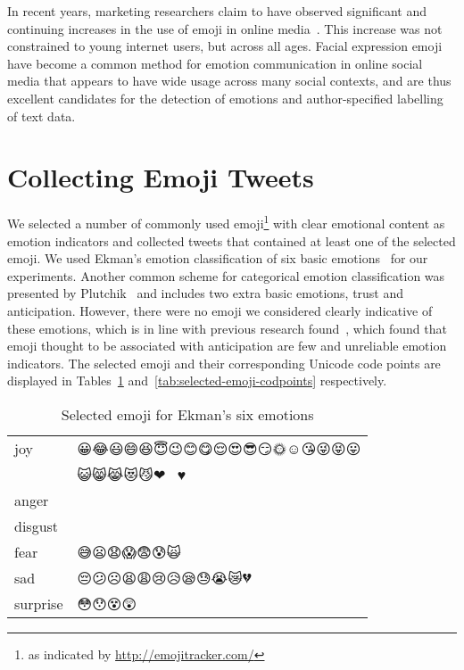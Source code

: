\documentclass[10pt, a4paper]{article}
\begin{document}
In recent years, marketing researchers claim to have observed significant and continuing increases in the use of emoji in online media~\cite{Com20152015}. This increase was not constrained to young internet users, but across all ages. 
Facial expression emoji have become a common method for emotion communication in online social media that appears to have wide usage across many social contexts, and are thus excellent candidates for the detection of emotions and author-specified labelling of text data.


\section{Collecting Emoji Tweets}
We selected a number of commonly used emoji\footnote{as indicated by \url{http://emojitracker.com/}} with clear emotional content as emotion indicators and collected tweets that contained at least one of the selected emoji. We used Ekman's emotion classification of six basic emotions~\cite{Ekman1992Argument} for our experiments.
Another common scheme for categorical emotion classification was presented by Plutchik~ and includes two extra basic emotions, trust and anticipation. However,
there were no emoji we considered clearly indicative of these emotions, which is in line with previous research found~\cite{Suttles2013Distant}, which found that emoji thought to be associated with anticipation are few and unreliable emotion indicators. The selected emoji and their corresponding Unicode code points are displayed in Tables~\ref{tab:selected-emoji} and~\ref{tab:selected-emoji-codpoints} respectively.

\begin{table}
	\begin{tabular}{ll}
		joy & 😀😂😃😄😆😇😉😊😋😌😍😎😏🌞☺😘😜😝😛 \\
		& 😺😸😹😻😼❤💖💕😁♥ \\
		anger & 😬😠😐😑😠😡😖😤😾 \\
		disgust & 💩 \\
		fear & 😅😦😧😱😨😰🙀 \\
		sad & 😔😕☹😫😩😢😥😪😓😭😿💔 \\
		surprise & 😳😯😵😲 \\
	\end{tabular}
	\caption{Selected emoji for Ekman's six emotions}
	\label{tab:selected-emoji}
\end{table}
\end{document}
